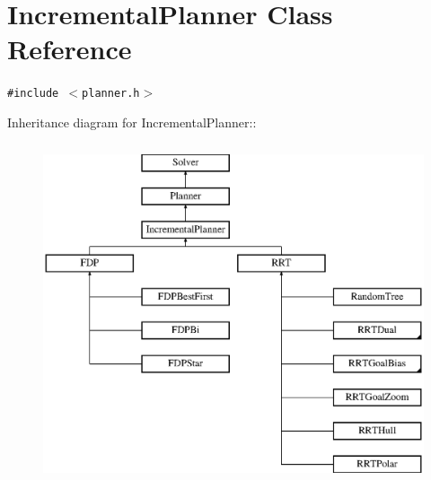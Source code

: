 \section{Incremental\-Planner  Class Reference}
\label{class_IncrementalPlanner}
{\tt \#include $<$planner.h$>$}

Inheritance diagram for Incremental\-Planner::\begin{figure}[H]
\begin{center}
\leavevmode
\includegraphics[height=10cm]{class_IncrementalPlanner}
\end{center}
\end{figure}

